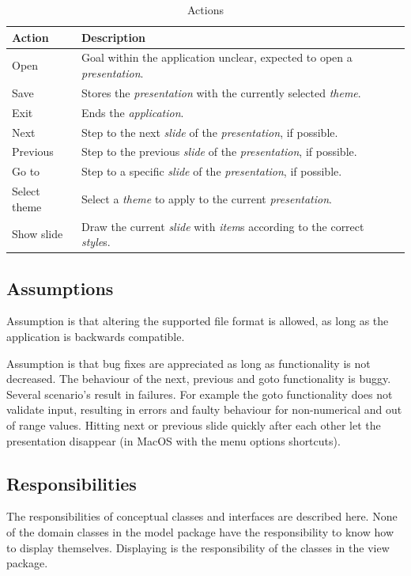 \documentclass[a4paper]{article}
\begin{document}
\begin{table}[!htpb]
\centering
\begin{tabular}{|l|l|l|l|}
\hline
\textbf{Action} & \textbf{Description}\\
\hline
\hline
Open & Goal within the application unclear, expected to open a \textit{presentation}.\\
\hline
Save & Stores the \textit{presentation} with the currently selected \textit{theme}.\\ 
\hline
Exit & Ends the \textit{application}.\\
\hline
Next & Step to the next \textit{slide} of the \textit{presentation}, if possible.\\
\hline
Previous & Step to the previous \textit{slide} of the \textit{presentation}, if possible.\\
\hline
Go to & Step to a specific \textit{slide} of the \textit{presentation}, if possible.\\
\hline
Select theme & Select a \textit{theme} to apply to the current \textit{presentation}.\\
\hline
Show slide & Draw the current \textit{slide} with \textit{item}s according to the correct \textit{style}s.\\
\hline
\end{tabular}
\caption{Actions}
\label{tab:template}
\end{table}

\subsection{Assumptions}
Assumption is that altering the supported file format is allowed, as long as the application is backwards compatible.

Assumption is that bug fixes are appreciated as long as functionality is not decreased. The behaviour of the next, previous and goto functionality is buggy. Several scenario's result in failures. For example the goto functionality does not validate input, resulting in errors and faulty behaviour for non-numerical and out of range values. Hitting next or previous slide quickly after each other let the presentation disappear (in MacOS with the menu options shortcuts).   

\subsection {Responsibilities} 
The responsibilities of conceptual classes and interfaces are described here. None of the domain classes in the model package have the responsibility to know how to display themselves. Displaying is the responsibility of the classes in the view package.
\end{document}
